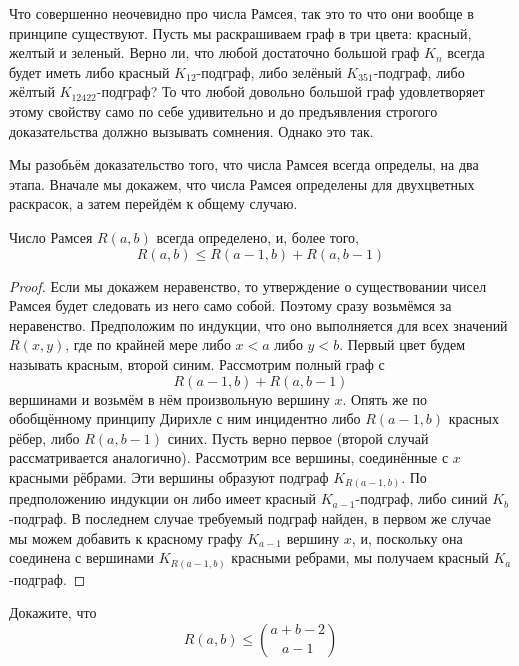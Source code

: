 Что совершенно неочевидно про числа Рамсея, так это то что они вообще в принципе существуют. Пусть мы раскрашиваем граф в три цвета: красный, желтый и зеленый. Верно ли, что любой достаточно большой граф $K_n$ всегда будет иметь либо красный $K_{12}$-подграф, либо зелёный $K_{351}$-подграф, либо жёлтый $K_{12422}$-подграф? То что любой довольно большой граф удовлетворяет этому свойству само по себе удивительно и до предъявления строгого доказательства должно вызывать сомнения. Однако это так.

Мы разобьём доказательство того, что числа Рамсея всегда определы, на два этапа. Вначале мы докажем, что числа Рамсея определены для двухцветных раскрасок, а затем перейдём к общему случаю.

\begin{thm}
Число Рамсея $R(a, b)$ всегда определено, и, более того,
$$R(a, b) \le R(a - 1, b) + R(a, b- 1)$$
\end{thm}
\begin{proof}
Если мы докажем неравенство, то утверждение о существовании чисел Рамсея будет следовать из него само собой. Поэтому сразу возьмёмся за неравенство. Предположим по индукции, что оно выполняется для всех значений $R(x, y)$, где по крайней мере либо $x<a$ либо $y<b$. Первый цвет будем называть красным, второй синим. Рассмотрим полный граф с
$$R(a - 1, b) + R(a, b- 1)$$
вершинами и возьмём в нём произвольную вершину $x$. Опять же по обобщённому принципу Дирихле с ним инцидентно либо $R(a-1, b)$ красных рёбер, либо $R(a, b-1)$ синих. Пусть верно первое (второй случай рассматривается аналогично). Рассмотрим все вершины, соединённые с $x$ красными рёбрами. Эти вершины образуют подграф $K_{R(a-1, b)}$. По предположению индукции он либо имеет красный $K_{a-1}$-подграф, либо синий $K_b$-подграф. В последнем случае требуемый подграф найден, в первом же случае мы можем добавить к красному графу $K_{a-1}$ вершину $x$, и, поскольку она соединена с вершинами $K_{R(a-1, b)}$ красными ребрами, мы получаем красный $K_a$-подграф.
\end{proof}

\begin{exercise}
Докажите, что
$$R(a, b) \le {a+b-2\choose a - 1}$$
\end{exercise}

